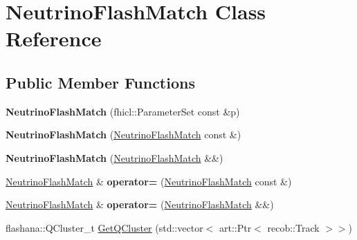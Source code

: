\hypertarget{classNeutrinoFlashMatch}{\section{\-Neutrino\-Flash\-Match \-Class \-Reference}
\label{classNeutrinoFlashMatch}
}
\subsection*{\-Public \-Member \-Functions}
\begin{DoxyCompactItemize}
\item 
\hypertarget{classNeutrinoFlashMatch_a2c3aa4e9461e3f31e9d198ba5d481cd6}{{\bfseries \-Neutrino\-Flash\-Match} (fhicl\-::\-Parameter\-Set const \&p)}\label{classNeutrinoFlashMatch_a2c3aa4e9461e3f31e9d198ba5d481cd6}

\item 
\hypertarget{classNeutrinoFlashMatch_a274b502322eee527a58f418f2ef45b56}{{\bfseries \-Neutrino\-Flash\-Match} (\hyperlink{classNeutrinoFlashMatch}{\-Neutrino\-Flash\-Match} const \&)}\label{classNeutrinoFlashMatch_a274b502322eee527a58f418f2ef45b56}

\item 
\hypertarget{classNeutrinoFlashMatch_a5191a4fe7a1cbb25346eb6bba9edd144}{{\bfseries \-Neutrino\-Flash\-Match} (\hyperlink{classNeutrinoFlashMatch}{\-Neutrino\-Flash\-Match} \&\&)}\label{classNeutrinoFlashMatch_a5191a4fe7a1cbb25346eb6bba9edd144}

\item 
\hypertarget{classNeutrinoFlashMatch_a86dab2fde3a8b37a5ec89e4dc1850a2e}{\hyperlink{classNeutrinoFlashMatch}{\-Neutrino\-Flash\-Match} \& {\bfseries operator=} (\hyperlink{classNeutrinoFlashMatch}{\-Neutrino\-Flash\-Match} const \&)}\label{classNeutrinoFlashMatch_a86dab2fde3a8b37a5ec89e4dc1850a2e}

\item 
\hypertarget{classNeutrinoFlashMatch_ab9c0c085e8f31926395d06088c02fafe}{\hyperlink{classNeutrinoFlashMatch}{\-Neutrino\-Flash\-Match} \& {\bfseries operator=} (\hyperlink{classNeutrinoFlashMatch}{\-Neutrino\-Flash\-Match} \&\&)}\label{classNeutrinoFlashMatch_ab9c0c085e8f31926395d06088c02fafe}

\item 
\hypertarget{classNeutrinoFlashMatch_aa511b92472bb70883c5a666293be1da3}{flashana\-::\-Q\-Cluster\-\_\-t \hyperlink{classNeutrinoFlashMatch_aa511b92472bb70883c5a666293be1da3}{\-Get\-Q\-Cluster} (std\-::vector$<$ art\-::\-Ptr$<$ recob\-::\-Track $>$$>$)}\label{classNeutrinoFlashMatch_aa511b92472bb70883c5a666293be1da3}


\end{DoxyCompactItemize}
